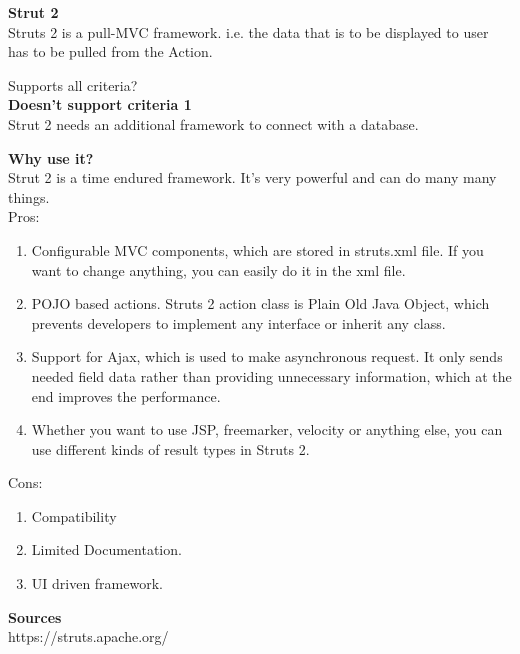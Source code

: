 		\textbf{Strut 2} \\
		Struts 2 is a pull-MVC framework. i.e. the data that is to be displayed to user has to be pulled from the Action.
		
		Supports all criteria?\\
		\textbf{Doesn't support criteria 1}\\
	 	Strut 2 needs an additional framework  to connect with a database.

 		\textbf{Why use it?} \\
		Strut 2 is a time endured framework. It's very powerful and can do many many things. \\
		
		Pros:
		\begin{enumerate}
			\item Configurable MVC components, which are stored in struts.xml file. If you want to change anything, you can easily do it in the xml file.
			\item POJO based actions. Struts 2 action class is Plain Old Java Object, which prevents developers to implement any interface or inherit any class.
			\item Support for Ajax, which is used to make asynchronous request. It only sends needed field data rather than providing unnecessary information, which at the end improves the performance.
			\item Whether you want to use JSP, freemarker, velocity or anything else, you can use different kinds of result types in Struts 2.
		\end{enumerate}
		Cons:
		\begin{enumerate}
			\item Compatibility
			\item Limited Documentation.
			\item UI driven framework.
		\end{enumerate}
	
	\textbf{Sources}\\
	https://struts.apache.org/
